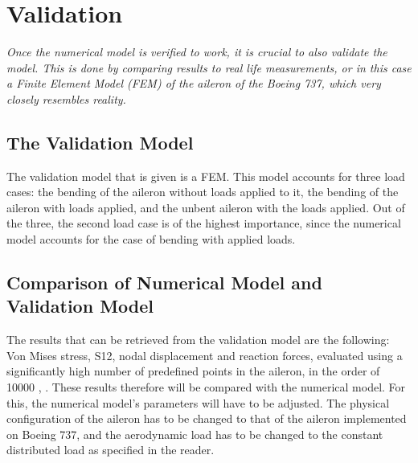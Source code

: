 \section{Validation}
\label{sec:Validation}
\textit{Once the numerical model is verified to work, it is crucial to also validate the model. This is done by comparing results to real life measurements, or in this case a Finite Element Model (FEM) of the aileron of the Boeing 737, which very closely resembles reality.}

\subsection{The Validation Model} 
The validation model that is given is a FEM. This model accounts for three load cases: the bending of the aileron without loads applied to it, the bending of the aileron with loads applied, and the unbent aileron with the loads applied. Out of the three, the second load case is of the highest importance, since the numerical model accounts for the case of bending with applied loads.

\subsection{Comparison of Numerical Model and Validation Model}
The results that can be retrieved from the validation model are the following: Von Mises stress, S12, nodal displacement and reaction forces, evaluated using a significantly high number of predefined points in the aileron, in the order of 10000 \cite{Assignment_description}, \cite{SVV_Validation_Data_2020}. These results therefore will be compared with the numerical model. For this, the numerical model's parameters will have to be adjusted. The physical configuration of the aileron has to be changed to that of the aileron implemented on Boeing 737, and the aerodynamic load has to be changed to the constant distributed load as specified in the reader.\\

